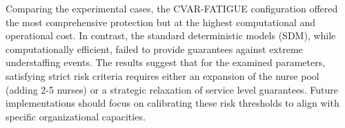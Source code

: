 \documentclass[10pt,a4paper,twocolumn]{article}
\begin{document}
Comparing the experimental cases, the CVAR-FATIGUE configuration offered the most comprehensive protection but at the highest computational and operational cost. In contrast, the standard deterministic models (SDM), while computationally efficient, failed to provide guarantees against extreme understaffing events. The results suggest that for the examined parameters, satisfying strict risk criteria requires either an expansion of the nurse pool (adding 2-5 nurses) or a strategic relaxation of service level guarantees. Future implementations should focus on calibrating these risk thresholds to align with specific organizational capacities.

\clearpage
\end{document}
